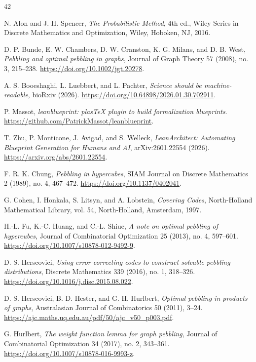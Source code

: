 \documentclass[11pt]{article}
\theoremstyle{plain}
\theoremstyle{definition}
\begin{document}
\begin{thebibliography}{42}

N. Alon and J. H. Spencer,
\emph{The Probabilistic Method},
4th ed., Wiley Series in Discrete Mathematics and Optimization, Wiley, Hoboken, NJ,
2016.

D. P. Bunde, E. W. Chambers, D. W. Cranston, K. G. Milans, and D. B. West,
\emph{Pebbling and optimal pebbling in graphs},
Journal of Graph Theory 57 (2008), no. 3, 215--238.
\url{https://doi.org/10.1002/jgt.20278}.

A. S. Booeshaghi, L. Luebbert, and L. Pachter,
\emph{Science should be machine-readable},
bioRxiv (2026).
\url{https://doi.org/10.64898/2026.01.30.702911}.

P. Massot,
\emph{leanblueprint: plasTeX plugin to build formalization blueprints}.
\url{https://github.com/PatrickMassot/leanblueprint}.

T. Zhu, P. Monticone, J. Avigad, and S. Welleck,
\emph{LeanArchitect: Automating Blueprint Generation for Humans and AI},
arXiv:2601.22554 (2026).
\url{https://arxiv.org/abs/2601.22554}.

F. R. K. Chung,
\emph{Pebbling in hypercubes},
SIAM Journal on Discrete Mathematics 2 (1989), no. 4, 467--472.
\url{https://doi.org/10.1137/0402041}.

G. Cohen, I. Honkala, S. Litsyn, and A. Lobstein,
\emph{Covering Codes},
North-Holland Mathematical Library, vol. 54, North-Holland, Amsterdam, 1997.

H.-L. Fu, K.-C. Huang, and C.-L. Shiue,
\emph{A note on optimal pebbling of hypercubes},
Journal of Combinatorial Optimization 25 (2013), no. 4, 597--601.
\url{https://doi.org/10.1007/s10878-012-9492-9}.

D. S. Herscovici,
\emph{Using error-correcting codes to construct solvable pebbling distributions},
Discrete Mathematics 339 (2016), no. 1, 318--326.
\url{https://doi.org/10.1016/j.disc.2015.08.022}.

D. S. Herscovici, B. D. Hester, and G. H. Hurlbert,
\emph{Optimal pebbling in products of graphs},
Australasian Journal of Combinatorics 50 (2011), 3--24.
\url{https://ajc.maths.uq.edu.au/pdf/50/ajc_v50_p003.pdf}.

G. Hurlbert,
\emph{The weight function lemma for graph pebbling},
Journal of Combinatorial Optimization 34 (2017), no. 2, 343--361.
\url{https://doi.org/10.1007/s10878-016-9993-z}.


\end{thebibliography}
\end{document}
